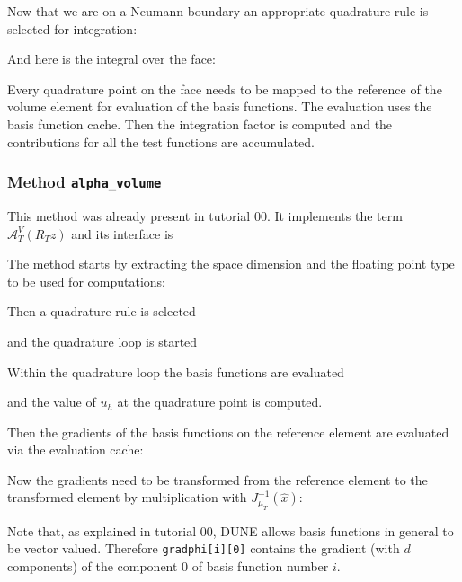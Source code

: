 \documentclass[a4paper,12pt]{article}
\begin{document}
Now that we are on a Neumann boundary an appropriate quadrature rule
is selected for integration:


And here is the integral over the face:

Every quadrature point on the face needs to be mapped to the reference
of the volume element for evaluation of the basis functions.
The evaluation uses the basis function cache. Then the integration
factor is computed and the contributions for all the test functions
are accumulated.

\subsubsection*{Method \lstinline{alpha_volume}}

This method was already present in tutorial 00. 
It implements the term $\mathcal{A}_T^V(R_T z)$ and its interface is


The method starts by extracting the space dimension and
the floating point type to be used for computations:


Then a quadrature rule is selected

and the quadrature loop is started


Within the quadrature loop the basis functions are evaluated

and the value of $u_h$ at the quadrature point is computed.

Then the gradients of the basis functions on the reference element are evaluated
via the evaluation cache:

Now the gradients need to be transformed from the reference element
to the transformed element by multiplication with $J_{\mu_T}^{-1}(\hat x)$:

Note that, as explained in tutorial 00, DUNE allows basis functions
in general to be vector valued. Therefore \lstinline{gradphi[i][0]} contains
the gradient (with $d$ components) of the component 0 of basis function number $i$.
\end{document}
